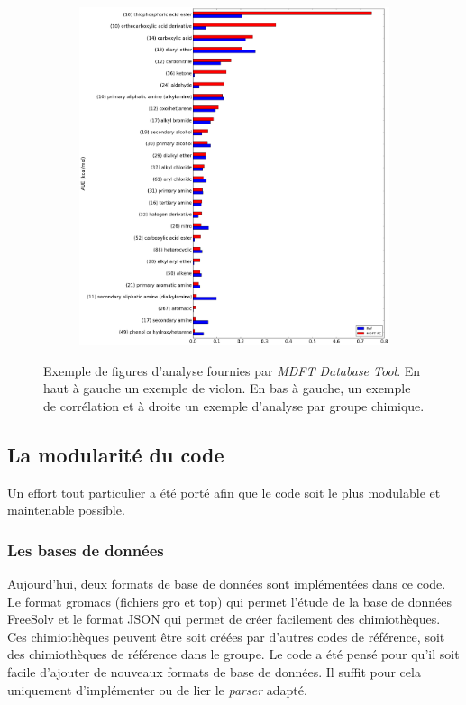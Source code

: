 \begin{figure}[h]
\begin{subfigure}[b]{0.40\textwidth}
   \end{subfigure}
   \hspace{5mm}
   \begin{subfigure}[b]{0.59\textwidth}
         \includegraphics[width=\textwidth]{chapters/BDD/images/freesolv_1/PC_error_by_groups.png}
    \end{subfigure}
  \caption[Exemple de figures d'analyse fournies par \textit{MDFT Database Tool}.]{Exemple de figures d'analyse fournies par \textit{MDFT Database Tool}. En haut à gauche un exemple de violon. En bas à gauche, un exemple de corrélation et à droite un exemple d'analyse par groupe chimique.}
  \label{fig:examples}
\end{figure}


\subsection{La modularité du code}
Un effort tout particulier a été porté afin que le code soit le plus modulable et maintenable possible. 

\subsubsection{Les bases de données}
Aujourd'hui, deux formats de base de données sont implémentées dans ce code. Le format gromacs (fichiers gro et top) qui permet l'étude de la base de données FreeSolv et le format JSON qui permet de créer facilement des chimiothèques. Ces chimiothèques peuvent être soit créées par d'autres codes de référence, soit des chimiothèques de référence dans le groupe. Le code a été pensé pour qu'il soit facile d'ajouter de nouveaux formats de base de données. Il suffit pour cela uniquement d'implémenter ou de lier le \textit{parser} adapté.

